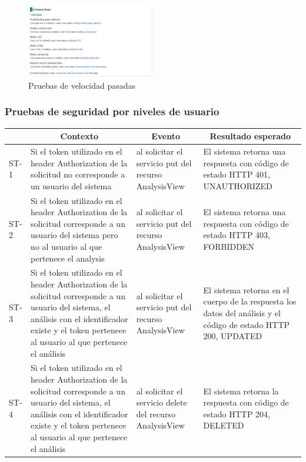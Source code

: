   \begin{figure}[h]
  	\centering
  	\includegraphics[width=0.5\textwidth]{img/prueba_velocidad_2}
  	\caption{Pruebas de velocidad pasadas}
  	\label{prueba_velocidad_2}
  \end{figure}
  \subsubsection{Pruebas de seguridad por niveles de usuario}
  
  \begin{longtable}{|p{1.0cm}|p{4cm}|p{4cm}|p{4cm}| }
  	
  	\hline
  	\rowcolor[gray]{0.9} 
  	\multicolumn{1}{|c}{Id test seguridad} & \multicolumn{1}{|c|}{Contexto} & \multicolumn{1}{|c|}{Evento} & \multicolumn{1}{|c|}{Resultado esperado} \\
  	\hline
  	ST-1 & Si el token utilizado en el header Authorization de la solicitud no corresponde a un usuario del sistema  & al solicitar el servicio put del recurso AnalysisView & El sistema retorna una respuesta con código de estado HTTP 401, UNAUTHORIZED\\
  	\hline
  	ST-2 & Si el token utilizado en el header Authorization de la solicitud corresponde a un usuario del sistema pero no al usuario al que pertenece el analysis & al solicitar el servicio put del recurso AnalysisView & El sistema retorna una respuesta con código de estado HTTP 403, FORBIDDEN\\
  	\hline
  	ST-3 & Si el token utilizado en el header Authorization de la solicitud corresponde a un usuario del sistema, el análisis con el identificador existe y el token pertenece al usuario al que pertenece el análisis & al solicitar el servicio put del recurso AnalysisView & El sistema retorna en el cuerpo de la respuesta los datos del análisis y el código de estado HTTP 200, UPDATED\\
  	\hline
  	ST-4 & Si el token utilizado en el header Authorization de la solicitud corresponde a un usuario del sistema, el análisis con el identificador existe y el token pertenece al usuario al que pertenece el análisis & al solicitar el servicio delete del recurso AnalysisView & El sistema retorna la respuesta con código de estado HTTP 204, DELETED\\
  	\hline
  	
  \end{longtable}
  
